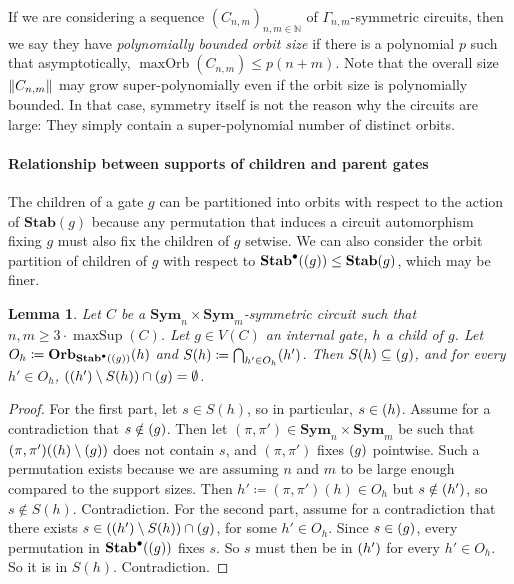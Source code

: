 \documentclass[11pt, DIV=15]{scrarticle}
\theoremstyle{definition}
\theoremstyle{plain}
\newtheorem{lemma}[definition]{Lemma}
\theoremstyle{remark}
\DeclarePairedDelimiter{\norm}{\lVert}{\rVert}
\newcommand{\Sym}{\mathbf{Sym}}
\newcommand{\Stab}{\mathbf{Stab}}
\newcommand{\StabP}{\Stab^{\bullet}}
\newcommand{\Orb}{\mathbf{Orb}}
\newcommand{\bbN}{\mathbb{N}}
\let\sup\relax
\DeclareMathOperator{\sup}{sup}
\DeclareMathOperator{\maxOrb}{maxOrb}
\DeclareMathOperator{\maxSup}{maxSup}
\begin{document}
If we are considering a sequence $(C_{n,m})_{n,m \in \bbN}$ of $\Gamma_{n,m}$-symmetric circuits, then we say they have \emph{polynomially bounded orbit size} if there is a polynomial $p$ such that asymptotically, $\maxOrb(C_{n,m}) \leq p(n+m)$. Note that the overall size $\norm{C_{n,m}}$ may grow super-polynomially even if the orbit size is polynomially bounded. In that case, symmetry itself is not the reason why the circuits are large: They simply contain a super-polynomial number of distinct orbits.



\paragraph*{Relationship between supports of children and parent gates}

The children of a gate $g$ can be partitioned into orbits with respect to the action of $\Stab(g)$ because any permutation that induces a circuit automorphism fixing $g$ must also fix the children of $g$ setwise. We can also consider the orbit partition of children of $g$ with respect to $\StabP(\sup(g)) \leq \Stab(g)$, which may be finer. 
\begin{lemma}
\label{lem:intersectionOfChildSupports}
Let $C$ be a $\Sym_n \times \Sym_m$-symmetric circuit such that $n,m \geq 3 \cdot \maxSup(C)$. 
Let $g \in V(C)$ an internal gate, $h$ a child of $g$.
Let $O_h \coloneqq \Orb_{\StabP(\sup(g))}(h)$ and $S(h) \coloneqq \bigcap_{h' \in O_h} \sup(h')$.
Then $S(h) \subseteq \sup(g)$, and for every $h' \in O_h$, $(\sup(h') \setminus S(h)) \cap \sup(g) = \emptyset$. 
\end{lemma}	
\begin{proof}
For the first part, let $s \in S(h)$, so in particular, $s \in \sup(h)$. Assume for a contradiction that $s \notin \sup(g)$. Then let $(\pi, \pi') \in \Sym_n \times \Sym_m$ be such that $(\pi, \pi')(\sup(h) \setminus \sup(g))$ does not contain $s$, and $(\pi, \pi')$ fixes $\sup(g)$ pointwise. Such a permutation exists because we are assuming $n$ and $m$ to be large enough compared to the support sizes. Then $h' \coloneqq (\pi, \pi')(h) \in O_h$ but $s \notin \sup(h')$, so $s \notin S(h)$. Contradiction.
For the second part, assume for a contradiction that there exists $s \in (\sup(h') \setminus S(h)) \cap \sup(g)$, for some $h' \in O_h$. Since $s \in \sup(g)$, every permutation in $\StabP(\sup(g))$ fixes $s$. So $s$ must then be in $\sup(h')$ for every $h' \in O_h$. So it is in $S(h)$. Contradiction.	
\end{proof}	
\end{document}
